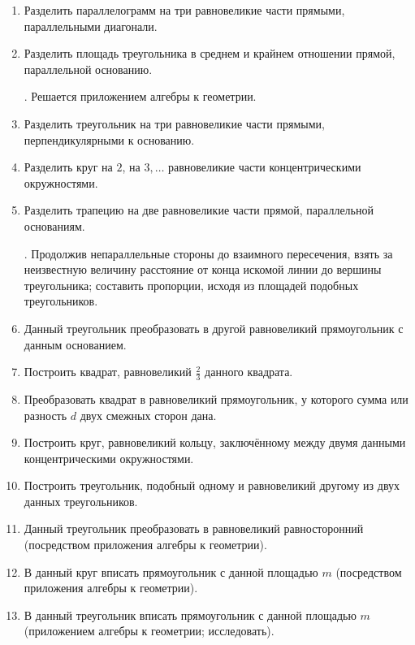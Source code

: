 \documentclass[twoside]{book}
\begin{document}
\begin{enumerate}[resume]


 \item
Разделить параллелограмм на три равновеликие части прямыми, параллельными диагонали.

 \item
Разделить площадь треугольника в среднем и крайнем отношении прямой, параллельной основанию.

\smallskip
{}.
Решается приложением алгебры к геометрии.

 \item
Разделить треугольник на три равновеликие части прямыми, перпендикулярными к основанию.

 \item
Разделить круг на $2$, на $3,\dots$ равновеликие части концентрическими окружностями.

 \item
Разделить трапецию на две равновеликие части прямой, параллельной основаниям.

\smallskip
{}.
Продолжив непараллельные стороны до взаимного пересечения, взять за неизвестную величину расстояние от конца искомой линии до вершины треугольника;
составить пропорции, исходя из площадей подобных треугольников.

 \item
Данный треугольник преобразовать в другой равновеликий прямоугольник с данным основанием.

 \item
Построить квадрат, равновеликий $\tfrac23$ данного квадрата.

 \item
Преобразовать квадрат в равновеликий прямоугольник, у которого сумма или разность $d$ двух смежных сторон дана.

 \item
Построить круг, равновеликий кольцу, заключённому между двумя данными концентрическими окружностями.

 \item
Построить треугольник, подобный одному и равновеликий другому из двух данных треугольников.

 \item
Данный треугольник преобразовать в равновеликий равносторонний (посредством приложения алгебры к геометрии).

 \item
В данный круг вписать прямоугольник с данной площадью $m$ (посредством приложения алгебры к геометрии).

 \item
В данный треугольник вписать прямоугольник с данной площадью $m$ (приложением алгебры к геометрии; исследовать).

\end{enumerate}

{\scriptsize
\printindex
}


\tableofcontents


\end{document}

